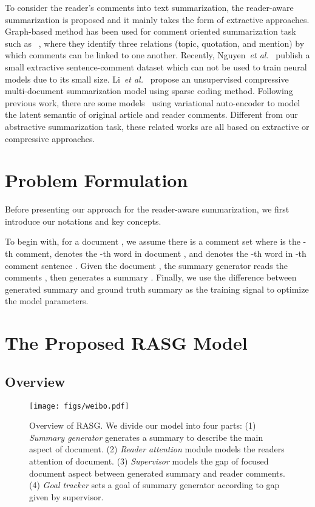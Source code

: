 \documentclass[letterpaper]{article} \usepackage{aaai19}  \usepackage{times}  \usepackage{helvet}  \usepackage{courier}
\newcommand{\etal}{\emph{et al.}\xspace}
\begin{document}
To consider the reader's comments into text summarization, the reader-aware summarization is proposed and it mainly takes the form of extractive approaches. 
Graph-based method has been used for comment oriented summarization task such as ~\cite{Hu2007CommentsorientedBS,Hu2008CommentsorientedDS},  where they identify three relations (topic, quotation, and mention) by which comments can be linked to one another.
Recently, Nguyen~\etal~ publish a small extractive sentence-comment dataset which can not be used to train neural models due to its small size. 
Li~\etal~ propose an unsupervised compressive multi-document summarization model using sparse coding method.
Following previous work, there are some models~\cite{li2017reader,Li2017SalienceEV} using variational auto-encoder to model the latent semantic of original article and reader comments.
Different from our abstractive summarization task, these related works are all based on extractive or compressive approaches.


    
\section{Problem Formulation}
\label{sec:formulation}

Before presenting our approach for the reader-aware summarization, we first introduce our notations and key concepts. 




To begin with, for a document , we assume there is a comment set  where  is the -th comment,  denotes the -th word in document , and  denotes the -th word in -th comment sentence .
Given the document , the summary generator reads the comments , then generates a summary .
Finally, we use the difference between generated summary  and ground truth summary  as the training signal to optimize the model parameters.

\section{The Proposed RASG Model}

\subsection{Overview}

\begin{figure*}
    \centering
    \texttt{[image: figs/weibo.pdf]}
    \caption{Overview of RASG. We divide our model into four parts: (1) \textit{Summary generator} generates a summary to describe the main aspect of document. (2) \textit{Reader attention} module models the readers attention of document. (3) \textit{Supervisor} models the gap of focused document aspect between generated summary and reader comments. (4) \textit{Goal tracker} sets a goal of summary generator according to gap given by supervisor. 
    }
    \label{fig:overview}
\end{figure*}
\end{document}
